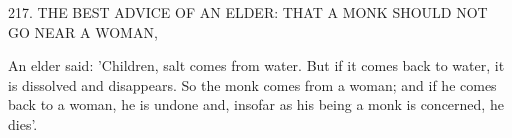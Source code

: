 217.
THE BEST ADVICE OF AN ELDER:
THAT A MONK SHOULD NOT GO NEAR A WOMAN,

An elder said: 'Children, salt comes from water.
But if it comes
back to water, it is dissolved and disappears.
So the monk comes
from a woman; and if he comes back to a woman, he is undone
and, insofar as his being a monk is concerned, he dies'.

